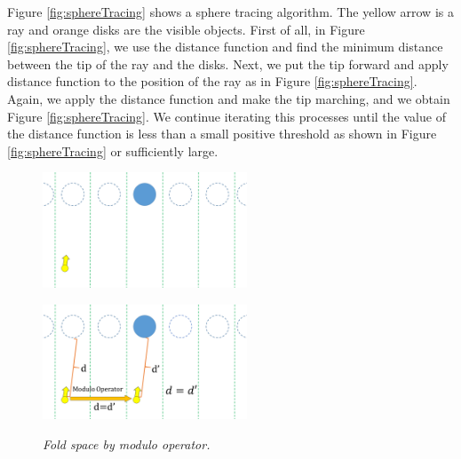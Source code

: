 Figure \ref{fig:sphereTracing} shows a sphere tracing algorithm.
The yellow arrow is a ray and orange disks are the visible objects.
First of all, in Figure \ref{fig:sphereTracing},
we use the distance function and find the minimum distance between
the tip of the ray and the disks.
Next, we put the tip forward and apply distance function to the position
of the ray as in Figure \ref{fig:sphereTracing}.
Again, we apply the distance function and make the tip marching, and we obtain
Figure \ref{fig:sphereTracing}.
We continue iterating this processes until the value of the distance
function is less than a small positive threshold as shown in Figure
\ref{fig:sphereTracing} or sufficiently large.

\begin{figure}[htbp]
 \begin{minipage}[t]{0.5\hsize}
  \center
  \includegraphics[height=1.35in, keepaspectratio]{img/visualization/translate1.png}
  \subcaption{\textit{}}
  \label{fig:modulo1}
  \hspace*{\fill}
 \end{minipage}
 \begin{minipage}[t]{0.5\hsize}
  \center
  \includegraphics[height=1.35in, keepaspectratio]{img/visualization/translate2.png}
  \subcaption{\textit{}}
  \label{fig:modulo2}
  \hspace*{\fill}
 \end{minipage}
 \caption{\textit{Fold space by modulo operator.}}
 \label{fig:moduloAll}
\end{figure}

